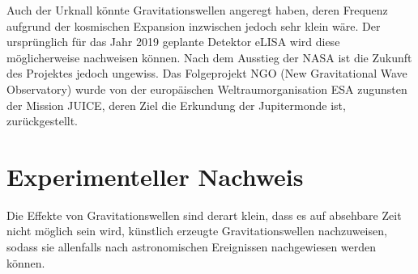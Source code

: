 Auch der Urknall könnte Gravitationswellen angeregt haben, deren Frequenz aufgrund der kosmischen Expansion inzwischen jedoch sehr klein wäre. Der ursprünglich für das Jahr 2019 geplante Detektor eLISA wird diese möglicherweise nachweisen können. Nach dem Ausstieg der NASA ist die Zukunft des Projektes jedoch ungewiss. Das Folgeprojekt NGO (New Gravitational Wave Observatory) wurde von der europäischen Weltraumorganisation ESA zugunsten der Mission JUICE, deren Ziel die Erkundung der Jupitermonde ist, zurückgestellt.

\chapter{Experimenteller Nachweis}
\label{chapter-fazit}
Die Effekte von Gravitationswellen sind derart klein, dass es auf absehbare Zeit nicht möglich sein wird, künstlich erzeugte Gravitationswellen nachzuweisen, sodass sie allenfalls nach astronomischen Ereignissen nachgewiesen werden können.
